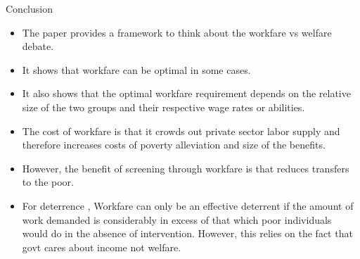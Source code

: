 \documentclass{beamer}
\begin{document}
\begin{frame}{Conclusion}
\begin{itemize}
    \item The paper provides a framework to think about the workfare vs welfare debate. 
    \item It shows that workfare can be optimal in some cases. 
    \item It also shows that the optimal workfare requirement depends on the relative size of the two groups and their respective wage rates or abilities.
    \item The cost of workfare is that it crowds out private sector labor supply and therefore increases costs of poverty alleviation and size of the benefits. 
    \item However, the benefit of screening through workfare is that reduces transfers to the poor.
    \item For deterrence , Workfare can
    only be an effective deterrent if the amount
    of work demanded is considerably in excess
    of that which poor individuals would do in
    the absence of intervention. However, this relies on the fact that govt cares about income not welfare.
\end{itemize}
\end{frame}
    
\end{document}
